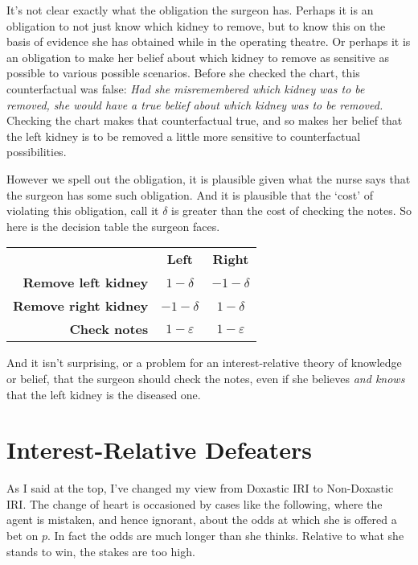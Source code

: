It's not clear exactly what the obligation the surgeon has. Perhaps it is an obligation to not just know which kidney to remove, but to know this on the basis of evidence she has obtained while in the operating theatre. Or perhaps it is an obligation to make her belief about which kidney to remove as sensitive as possible to various possible scenarios. Before she checked the chart, this counterfactual was false: \textit{Had she misremembered which kidney was to be removed, she would have a true belief about which kidney was to be removed.} Checking the chart makes that counterfactual true, and so makes her belief that the left kidney is to be removed a little more sensitive to counterfactual possibilities. 

However we spell out the obligation, it is plausible given what the nurse says that the surgeon has some such obligation. And it is plausible that the `cost' of violating this obligation, call it $\delta$ is greater than the cost of checking the notes. So here is the decision table the surgeon faces.

\begin{center}
\begin{tabular}{r c c}
 & \textbf{Left} & \textbf{Right} \\
\textbf{Remove left kidney} & $1-\delta$ & $-1-\delta$ \\
\textbf{Remove right kidney} & $-1-\delta$ & $1-\delta$ \\
\textbf{Check notes} & $1-\varepsilon$ & $1-\varepsilon$ \\
\end{tabular}
\end{center}

\noindent And it isn't surprising, or a problem for an interest-relative theory of knowledge or belief, that the surgeon should check the notes, even if she believes \textit{and knows} that the left kidney is the diseased one.
 
\section{Interest-Relative Defeaters}

As I said at the top, I've changed my view from Doxastic IRI to Non-Doxastic IRI. The change of heart is occasioned by cases like the following, where the agent is mistaken, and hence ignorant, about the odds at which she is offered a bet on $p$. In fact the odds are much longer than she thinks. Relative to what she stands to win, the stakes are too high.

